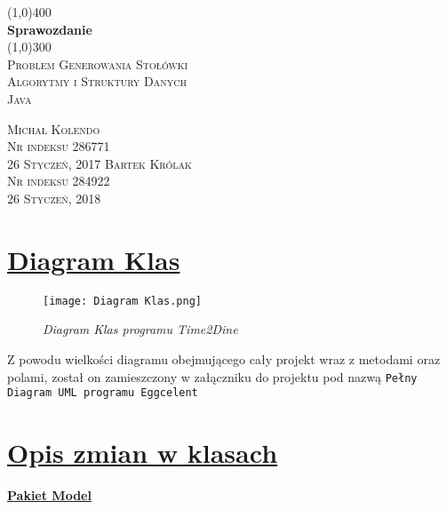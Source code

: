 \documentclass{article}
\author{Michal Kolendo}
\begin{document}
 
\begin{titlepage}
\begin{center}
\line(1,0){400}\\
[0.25in]
\huge{\bfseries Sprawozdanie}\\
[2mm]
\line(1,0){300}\\
[1.5cm]
\textsc{\LARGE Problem Generowania Stołówki}\\
[0.75cm]
\textsc{\Large Algorytmy i Struktury Danych}\\
[10cm]
\vspace{-9cm}
\textsc{Java}\\
[1cm]
\vspace{9cm}
\end{center}
\begin{flushright}
\textsc{\large Michał Kolendo\\
\small Nr indeksu 286771  \\
\large 26 Styczeń, 2017}
\textsc{\large Bartek Królak\\
\small Nr indeksu 284922  \\
\large 26 Styczeń, 2018}
\end{flushright}
\end{titlepage}
 
 
 
\setcounter{page}{1}
\section{\underline{Diagram Klas}}
		\begin{figure}[h]
		\hspace*{-5.3cm} 
				\texttt{[image: Diagram Klas.png]}
				\caption[Diagram Klas programu Time2Dine] {{\sl Diagram Klas programu Time2Dine}}
				\label{Diagram Klas programu Time2Dine}
		\end{figure}
Z powodu wielkości diagramu obejmującego cały projekt wraz z metodami oraz polami, został on zamieszczony w załączniku do projektu pod nazwą \verb|Pełny Diagram UML programu Eggcelent|


\newpage
\section{\underline{Opis zmian w klasach}}

\begin{center}
\vspace{3mm}
\underline{\huge\textbf{{Pakiet Model}}}
\end{center}
\end{document}
